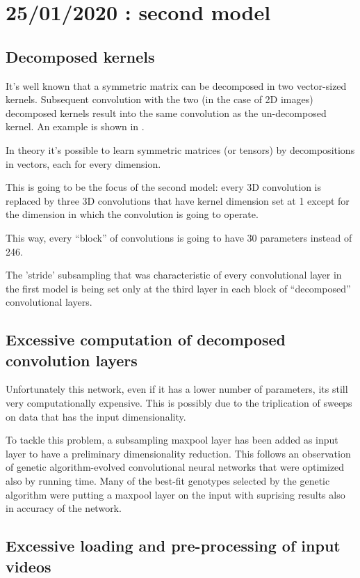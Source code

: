 \section{25/01/2020 : second model}

\subsection{Decomposed kernels}

It's well known that a symmetric matrix can be decomposed in two vector-sized kernels.
Subsequent convolution with the two (in the case of 2D images) decomposed kernels
result into the same convolution as the un-decomposed kernel.
An example is shown in \cite{Sobel}.

In theory it's possible to learn symmetric matrices (or tensors) by decompositions
in vectors, each for every dimension.

This is going to be the focus of the second model: every 3D convolution is
replaced by three 3D convolutions that have kernel dimension set at 1 except for the
dimension in which the convolution is going to operate.

This way, every ``block'' of convolutions is going to have 30 parameters instead of 246.

The 'stride' subsampling that was characteristic of every convolutional layer
in the first model is being set only at the third layer in each block of
``decomposed'' convolutional layers.

\subsection{Excessive computation of decomposed convolution layers}

Unfortunately this network, even if it has a lower number of parameters,
its still very computationally expensive.
This is possibly due to the triplication of sweeps on data that has the input 
dimensionality.

To tackle this problem, a subsampling maxpool layer has been added as input layer to
have a preliminary dimensionality reduction.
This follows an observation of genetic algorithm-evolved convolutional neural networks
that were optimized also by running time.
Many of the best-fit genotypes selected by the genetic algorithm
were putting a maxpool layer
on the input with suprising results also in accuracy of the network.

\subsection{Excessive loading and pre-processing of input videos}

